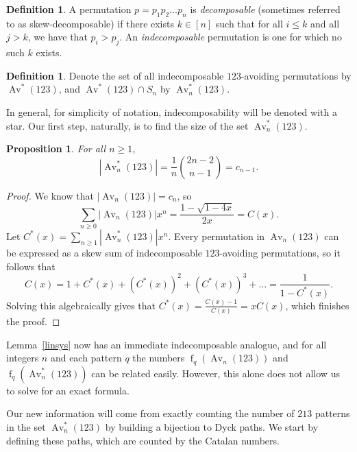\documentclass[11pt]{article} %
\theoremstyle{plain}
\newtheorem{proposition}[theorem]{Proposition}
\theoremstyle{definition}
\newtheorem{definition}[theorem]{Definition}
\newcommand{\Avns}{\Av_n^*(123)}
\newcommand{\Avn}{\Av_n(123)}
\DeclareMathOperator{\Av}{Av}
\DeclareMathOperator{\num}{f}
\begin{document}
  \begin{definition}
    A permutation $p = p_1p_2 \ldots p_n$ is \emph{decomposable}
    (sometimes referred to as skew-decomposable) if
    there exists $k \in [n]$ such that for all $i \leq k$ and all $j >
    k$, we have that $p_i > p_j$.
    An \emph{indecomposable} permutation is one for which no such $k$
    exists.
  \end{definition}

  \begin{definition}
    Denote the set of all indecomposable $123$-avoiding permutations
    by $\Av^* (123)$, and $\Av^* (123) \cap S_n$ by $\Avns$.
  \end{definition}

  In general, for simplicity of notation, indecomposability will be
  denoted with a star. Our first step, naturally, is to find the
  size of the set $\Avns$.

  \begin{proposition}
    For all $n \geq 1$,
    $$|\Avns| = \frac{1}{n} \binom{2n-2}{n-1} = c_{n-1}.$$
  \end{proposition}
  \begin{proof}
    We know that $|\Avn| = c_n$, so
    $$ \sum_{n \geq 0} |\Avn| x^n = \frac{1 - \sqrt{1 - 4x}}{2x} =
    C(x).$$ Let $C^*(x) = \sum_{n\geq 1} |\Avns| x^n$.
    Every permutation in $\Avn$ can be expressed as a skew sum of
    indecomposable $123$-avoiding permutations, so it follows that
    $$ C(x) = 1 + C^*(x) + (C^*(x))^2 + (C^*(x))^3 + \ldots =
    \frac{1}{1-C^*(x)}.$$
    Solving this algebraically gives that $C^*(x) =
    \frac{C(x)-1}{C(x)} = xC(x)$,
    which finishes the proof.
  \end{proof}


  Lemma~\ref{linsys} now has an immediate indecomposable analogue, and
  for all integers $n$ and each pattern $q$ the numbers
  $\num_q \left(\Avn\right)$ and $\num_q \left( \Avns \right)$ can be
  related easily.  However, this alone does not allow us to solve for
  an exact formula.

  Our new information will come from exactly counting the number of
  $213$ patterns in the set $\Avns$ by building a bijection to Dyck
  paths. We start by defining these paths, which are counted by the
  Catalan numbers.
\end{document}
